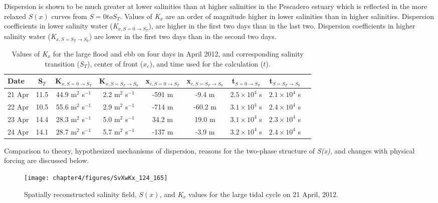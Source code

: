 Dispersion is shown to be much greater at lower salinities than at higher salinities in the Pescadero estuary which is reflected in the more relaxed $S(x)$ curves from $S=0 to S_T$.  Values of \emph{K$_x$} are an order of magnitude higher in lower salinities than in higher salinities. Dispersion coefficients in lower salinity water (\emph{K$_{x,S=0 \rightarrow S_T}$}), are higher in the first two days than in the last two. Dispersion coefficients in higher salinity water (\emph{K$_{x,S=S_T \rightarrow S_0}$}) are lower in the first two days than in the second two days. 

\begin{table}[h]
\renewcommand{\arraystretch}{1.3}

	\begin{center}
		\begin{tabular}{| l || c | c | c | c | c | c | c | c |}
		\hline
		Date & S$_{T}$ & K$_{x,S=0 \rightarrow S_T}$ &  K$_{x,S=S_T \rightarrow S_0}$ & x$_{c,S=0 \rightarrow S_T}$ & x$_{c,S=S_T \rightarrow S_0}$ & t$_{S=0 \rightarrow S_T}$ & t$_{S=S_T \rightarrow S_0}$\\
		\hline \hline
		21 Apr & 11.5 & 44.9 m$^2$ s$^{-1}$ & 2.2 m$^2$ s$^{-1}$ & -591 m & -9.4 m & $2.5\times10^4$ s & $2.1\times10^4$ s\\  
		22 Apr & 10.5 & 55.6 m$^2$ s$^{-1}$ & 2.9 m$^2$ s$^{-1}$ & -714 m & -60.2 m & $3.1\times10^4$ s & $2.4\times10^4$ s\\ 
		23 Apr & 14.4 & 28.3 m$^2$ s$^{-1}$ & 5.0 m$^2$ s$^{-1}$ & 34.2 m & 19.0 m & $3.1\times10^4$ s & $2.3\times10^4$ s\\ 
		24 Apr & 14.1 & 28.7 m$^2$ s$^{-1}$ & 5.7 m$^2$ s$^{-1}$ & -137 m & -3.9 m & $3.2\times10^4$ s & $2.4\times10^4$ s\\   \hline 
	\end{tabular}
	\caption{Values of \emph{K$_x$} for the large flood and ebb on four days in April 2012, and corresponding salinity transition ($S_T$), center of front ($x_c$), and time used for the calculation ($t$).}\label{tab:Kxtable}
\end{center}
\end{table}


Comparison to theory, hypothesized mechanisms of dispersion, reasons for the two-phase structure of \emph{S(x)}, and changes with physical forcing are discussed below. 
\begin{figure}[hp]
\centering
	\texttt{[image: chapter4/figures/SvXwKx\_124\_165]} 
\caption{Spatially reconstructed salinity field, $S(x)$, and \emph{K$_x$} values for the large tidal cycle on 21 April, 2012. } \label{fig:Kx421}
\end{figure}

